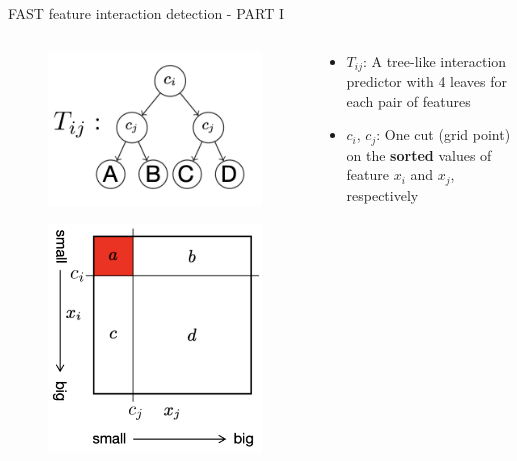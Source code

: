 \documentclass[11pt,compress,t,notes=noshow, aspectratio=169, xcolor=table]{beamer}
\begin{document}
\begin{frame}{FAST feature interaction detection - PART I}

\begin{columns}[T, totalwidth=\textwidth]
\begin{column}{0.5\textwidth}
\begin{figure}
    \centering
    \includegraphics[width=0.6\linewidth]
    {figure/Tij.png}
    \label{fig:tree-like predictor}
\end{figure}
\begin{figure}
    \centering
    \includegraphics[width=0.65\linewidth]
    {figure/FAST1.png}
    \label{fig:FAST1}
\end{figure}
\end{column}
\hfill
\centering
\begin{column}{0.6\textwidth}
\begin{itemize}
    \item $T_{ij}$: A tree-like interaction predictor with 4 leaves for each pair of features
    \item $c_i$, $c_j$: One cut (grid point) on the \textbf{sorted} values of feature $x_i$ and $x_j$, respectively

\end{itemize}
\end{column}
\end{columns}
\end{frame}
\end{document}
